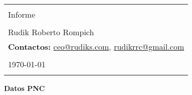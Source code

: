  \thispagestyle{empty} 
    \begin{tabular}{p{15.5cm}}
    \begin{tabbing}
    \textbf{Diálogos} \\
    Informe\\\\
   Rudik Roberto Rompich\\
   \textbf{Contactos:}  \href{ceo@rudiks.comt}{ceo@rudiks.com}, \href{rudikrrc@gmail.com}{rudikrrc@gmail.com}\\
    \end{tabbing}
    \begin{center}
        \LaTeX \\
        \today
    \end{center}\\
    \hline
    \\
    \end{tabular} 
    \vspace*{0.3cm} 
    \begin{center} 
    {\Large \bf  Datos PNC
} 
        \vspace{2mm}
    \end{center}
    \vspace{0.4cm}